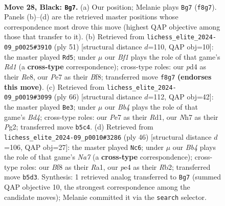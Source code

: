 \documentclass[11pt]{article}
\begin{document}
\clearpage

\begin{figure}[p]\centering
\begin{subfigure}{0.46\textwidth}\centering
\resizebox{\linewidth}{!}{%
\newchessgame
\chessboard[
  setfen={1k3b1r/1p2p2n/1r1p4/1b1Q2p1/3PP3/1P2RP2/6PP/1K5R b - - 1 28},
  showmover=false,
  pgfstyle=straightmove, color=movearrow, markmove={f8-g7}
]}
\caption{}
\end{subfigure}\hfill
\begin{subfigure}{0.46\textwidth}\centering
\resizebox{\linewidth}{!}{%
\newchessgame
\chessboard[
  setfen={3rrb1k/1p2nppp/2b5/p3PP2/P5Q1/1P4RP/6P1/4R1K1 b - - 0 26},
  showmover=false,
  pgfstyle=straightmove, color=movearrow, markmove={d8-d5}
]}
\caption{}
\end{subfigure}
\\[4pt]
\begin{subfigure}{0.46\textwidth}\centering
\resizebox{\linewidth}{!}{%
\newchessgame
\chessboard[
  setfen={r5k1/1b3pp1/4p2p/1P2P3/1PPB1q1P/p1R2N2/K5P1/3R4 w - - 2 34},
  showmover=false,
  pgfstyle=straightmove, color=movearrow, markmove={d4-e3}
]}
\caption{}
\end{subfigure}\hfill
\begin{subfigure}{0.46\textwidth}\centering
\resizebox{\linewidth}{!}{%
\newchessgame
\chessboard[
  setfen={5rk1/N1q1pp1p/1p4p1/5b2/1P6/P2Pp1PP/1R2P1B1/R5K1 w - - 1 24},
  showmover=false,
  pgfstyle=straightmove, color=movearrow, markmove={a7-c6}
]}
\caption{}
\end{subfigure}
\caption{\textbf{Move 28, Black: \texttt{Bg7}.} (a) Our position; Melanie plays \texttt{Bg7} (\texttt{f8g7}). Panels (b)--(d) are the retrieved master positions whose correspondence most drove this move (highest QAP objective among those that transfer to it). (b) Retrieved from \texttt{lichess\_elite\_2024-09\_p0025\#3910} (ply 51) [structural distance $d$=110, QAP obj=10]: the master played \texttt{Rd5}; under $\mu$ our \emph{Bf1} plays the role of that game's \emph{Rd1} (a \textbf{cross-type} correspondence); cross-type roles: our \emph{p}d4 as their \emph{R}e8, our \emph{P}e7 as their \emph{B}f8; transferred move \texttt{f8g7} \textbf{(endorses this move)}. (c) Retrieved from \texttt{lichess\_elite\_2024-09\_p0019\#3099} (ply 66) [structural distance $d$=112, QAP obj=42]: the master played \texttt{Be3}; under $\mu$ our \emph{Bb4} plays the role of that game's \emph{Bd4}; cross-type roles: our \emph{P}e7 as their \emph{R}d1, our \emph{N}h7 as their \emph{P}g2; transferred move \texttt{b5c4}. (d) Retrieved from \texttt{lichess\_elite\_2024-09\_p0010\#3286} (ply 46) [structural distance $d$=106, QAP obj=27]: the master played \texttt{Nc6}; under $\mu$ our \emph{Bb4} plays the role of that game's \emph{Na7} (a \textbf{cross-type} correspondence); cross-type roles: our \emph{B}f8 as their \emph{R}a1, our \emph{p}e4 as their \emph{R}b2; transferred move \texttt{b5d3}. Synthesis: 1 retrieved analog transferred to \texttt{Bg7} (summed QAP objective 10, the strongest correspondence among the candidate moves); Melanie committed it via the \texttt{search} selector.}
\label{fig:thought-m55}
\end{figure}
\end{document}
